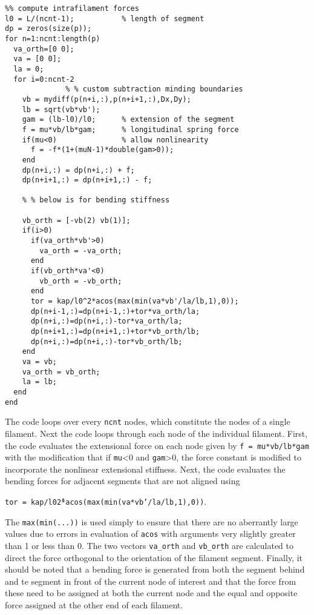 \begin{verbatim}
%% compute intrafilament forces    
l0 = L/(ncnt-1);           % length of segment
dp = zeros(size(p));
for n=1:ncnt:length(p)
  va_orth=[0 0];
  va = [0 0];
  la = 0;
  for i=0:ncnt-2
			  % % custom subtraction minding boundaries
    vb = mydiff(p(n+i,:),p(n+i+1,:),Dx,Dy); 
    lb = sqrt(vb*vb');
    gam = (lb-l0)/l0;      % extension of the segment
    f = mu*vb/lb*gam;      % longitudinal spring force
    if(mu<0)               % allow nonlinearity
      f = -f*(1+(muN-1)*double(gam>0));
    end
    dp(n+i,:) = dp(n+i,:) + f;
    dp(n+i+1,:) = dp(n+i+1,:) - f;
    
    % % below is for bending stiffness
    
    vb_orth = [-vb(2) vb(1)];
    if(i>0)
      if(va_orth*vb'>0)
        va_orth = -va_orth;
      end
      if(vb_orth*va'<0)
        vb_orth = -vb_orth;
      end
      tor = kap/l0^2*acos(max(min(va*vb'/la/lb,1),0));
      dp(n+i-1,:)=dp(n+i-1,:)+tor*va_orth/la;
      dp(n+i,:)=dp(n+i,:)-tor*va_orth/la;
      dp(n+i+1,:)=dp(n+i+1,:)+tor*vb_orth/lb;
      dp(n+i,:)=dp(n+i,:)-tor*vb_orth/lb;
    end
    va = vb;
    va_orth = vb_orth;
    la = lb;
  end
end
\end{verbatim}

The code loops over every \texttt{ncnt} nodes, which constitute the nodes of a single filament.  Next the code loops through each node of the individual filament.  First, the code evaluates the extensional force on each node given by \texttt{f = mu*vb/lb*gam} with the modification that if \texttt{mu}<0 and \texttt{gam}>0, the force constant is modified to incorporate the nonlinear extensional stiffness.  Next, the code evaluates the bending forces for adjacent segments that are not aligned using 

\texttt{tor = kap/l0\^2*acos(max(min(va*vb'/la/lb,1),0))}. 

 The \texttt{max(min(...))} is used simply to ensure that there are no aberrantly large values due to errors in evaluation of \texttt{acos} with arguments very slightly greater than 1 or less than 0.   The two vectors \texttt{va\_orth} and \texttt{vb\_orth} are calculated to direct the force orthogonal to the orientation of the filament segment.  Finally, it should be noted that a bending force is generated from both the segment behind and te segment in front of the current node of interest and that the force from these need to be assigned at both the current node and the equal and opposite force assigned at the other end of each filament.

